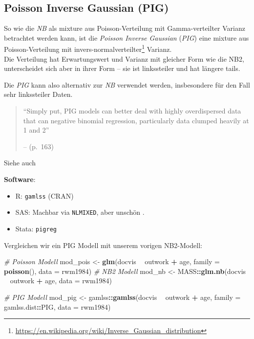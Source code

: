 \documentclass[ngerman,a4paper,]{scrartcl}
\newenvironment{Shaded}{\begin{snugshade}}{\end{snugshade}}
\newcommand{\CommentTok}[1]{\textcolor[rgb]{0.56,0.35,0.01}{\textit{#1}}}
\newcommand{\DataTypeTok}[1]{\textcolor[rgb]{0.13,0.29,0.53}{#1}}
\newcommand{\KeywordTok}[1]{\textcolor[rgb]{0.13,0.29,0.53}{\textbf{#1}}}
\newcommand{\NormalTok}[1]{#1}
\newcommand{\OperatorTok}[1]{\textcolor[rgb]{0.81,0.36,0.00}{\textbf{#1}}}
\newcommand{\StringTok}[1]{\textcolor[rgb]{0.31,0.60,0.02}{#1}}
\DeclareRobustCommand{\href}[2]{#2\footnote{\url{#1}}}
\providecommand{\tightlist}{%
  \setlength{\itemsep}{0pt}\setlength{\parskip}{0pt}}
\theoremstyle{definition}
\theoremstyle{definition}
\theoremstyle{definition}
\theoremstyle{remark}
\begin{document}
\hypertarget{mod-pig}{%
\subsection{Poisson Inverse Gaussian (PIG)}\label{mod-pig}}

So wie die \emph{NB} als mixture aus Poisson-Verteilung mit Gamma-verteilter Varianz betrachtet werden kann, ist die \emph{Poisson Inverse Gaussian} (\emph{PIG}) eine mixture aus Poisson-Verteilung mit \href{https://en.wikipedia.org/wiki/Inverse_Gaussian_distribution}{invers-normalverteilter} Varianz.\\
Die Verteilung hat Erwartungswert und Varianz mit gleicher Form wie die NB2, unterscheidet sich aber in ihrer Form -- sie ist linkssteiler und hat längere tails.

Die \emph{PIG} kann also alternativ zur \emph{NB} verwendet werden, insbesondere für den Fall sehr linkssteiler Daten.

\begin{quote}
\enquote{Simply put, PIG models can better deal with highly overdispersed data that can negative binomial regression, particularly data clumped heavily at 1 and 2}

-- \citet{hilbeModelingCountData2014} (p.~163)
\end{quote}

Siehe auch

\textbf{Software}:

\begin{itemize}
\tightlist
\item
  R: \texttt{gamlss} (CRAN)
\item
  SAS: Machbar via \texttt{NLMIXED}, aber unschön \citep[siehe][]{high2018AlternativeVariance}.
\item
  Stata: \texttt{pigreg}
\end{itemize}

Vergleichen wir ein PIG Modell mit unserem vorigen NB2-Modell:

\begin{Shaded}
\begin{Highlighting}[]
\CommentTok{# Poisson Modell}
\NormalTok{mod_pois <-}\StringTok{ }\KeywordTok{glm}\NormalTok{(docvis }\OperatorTok{~}\StringTok{ }\NormalTok{outwork }\OperatorTok{+}\StringTok{ }\NormalTok{age, }\DataTypeTok{family =} \KeywordTok{poisson}\NormalTok{(),}
              \DataTypeTok{data =}\NormalTok{ rwm1984)}
\CommentTok{# NB2 Modell}
\NormalTok{mod_nb <-}\StringTok{ }\NormalTok{MASS}\OperatorTok{::}\KeywordTok{glm.nb}\NormalTok{(docvis }\OperatorTok{~}\StringTok{ }\NormalTok{outwork }\OperatorTok{+}\StringTok{ }\NormalTok{age,}
                       \DataTypeTok{data =}\NormalTok{ rwm1984)}

\CommentTok{# PIG Modell}
\NormalTok{mod_pig <-}\StringTok{ }\NormalTok{gamlss}\OperatorTok{::}\KeywordTok{gamlss}\NormalTok{(docvis }\OperatorTok{~}\StringTok{ }\NormalTok{outwork }\OperatorTok{+}\StringTok{ }\NormalTok{age, }\DataTypeTok{family =}\NormalTok{ gamlss.dist}\OperatorTok{::}\NormalTok{PIG,}
                          \DataTypeTok{data =}\NormalTok{ rwm1984)}
\end{Highlighting}
\end{Shaded}
\end{document}
